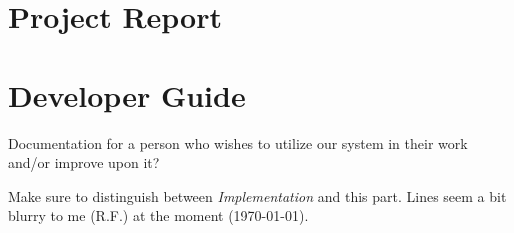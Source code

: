 \documentclass[a4paper,oneside]{alpenthesis/alpenthesis}
\begin{document}
\part{Project Report}
\label{part:project_report}
%








%

\part{Developer Guide}
\label{part:Developer_Guide}
Documentation for a person who wishes to utilize our system in their work and/or
improve upon it?

Make sure  to distinguish  between \emph{Implementation} and  this part. Lines
seem a bit blurry to me (R.F.) at the moment (\today).


\end{document}
